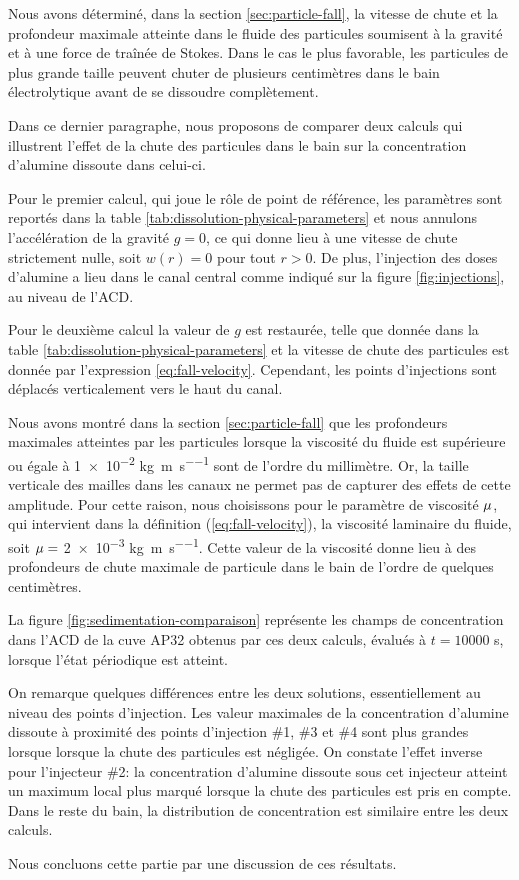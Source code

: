 Nous avons déterminé, dans la section \ref{sec:particle-fall}, la vitesse
de chute et la profondeur maximale atteinte dans le fluide des
particules soumisent à la gravité et à une force de traînée de
Stokes. Dans le cas le plus favorable, les particules de plus grande
taille peuvent chuter de plusieurs centimètres dans le bain
électrolytique avant de se dissoudre complètement.

Dans ce dernier paragraphe, nous proposons de comparer deux calculs
qui illustrent l'effet de la chute des particules dans le bain sur la
concentration d'alumine dissoute dans celui-ci.

Pour le premier calcul, qui joue le rôle de point de référence, les
paramètres sont reportés dans la table
\ref{tab:dissolution-physical-parameters} et nous annulons
l'accélération de la gravité $g = 0$, ce qui donne lieu à une vitesse
de chute strictement nulle, soit $w(r) = 0$ pour tout $r>0$. De plus,
l'injection des doses d'alumine a lieu dans le canal central comme
indiqué sur la figure \ref{fig:injections}, au niveau de l'ACD.

Pour le deuxième calcul la valeur de $g$ est restaurée, telle que
donnée dans la table \ref{tab:dissolution-physical-parameters} et la
vitesse de chute des particules est donnée par l'expression
\ref{eq:fall-velocity}. Cependant, les points d'injections sont
déplacés verticalement vers le haut du canal.

Nous avons montré dans la section \ref{sec:particle-fall} que les
profondeurs maximales atteintes par les particules lorsque la viscosité
du fluide est supérieure ou égale à \num{1e-2}
\si{\kilo\gram\per\meter\per\second} sont de l'ordre du
millimètre. Or, la taille verticale des mailles dans les canaux ne
permet pas de capturer des effets de cette amplitude. Pour cette
raison, nous choisissons pour le paramètre de viscosité
$\mu$, qui intervient dans la définition
(\ref{eq:fall-velocity}), la viscosité laminaire du fluide, soit
$\mu = $ \num{2e-3}
\si{\kilo\gram\per\meter\per\second}. Cette valeur de la viscosité
donne lieu à des profondeurs de chute maximale de particule dans le
bain de l'ordre de quelques centimètres.

La figure \ref{fig:sedimentation-comparaison} représente les champs de
concentration dans l'ACD de la cuve AP32 obtenus par ces deux calculs,
évalués à $t = \num{10000}$ \si{\second}, lorsque l'état périodique est
atteint.

On remarque quelques différences entre les deux solutions,
essentiellement au niveau des points d'injection. Les valeur maximales
de la concentration d'alumine dissoute à proximité des points
d'injection \#1, \#3 et \#4 sont plus grandes lorsque lorsque la chute
des particules est négligée. On constate l'effet inverse pour
l'injecteur \#2: la concentration d'alumine dissoute sous cet
injecteur atteint un maximum local plus marqué lorsque la chute des
particules est pris en compte. Dans le reste du bain, la distribution
de concentration est similaire entre les deux calculs.

Nous concluons cette partie par une discussion de ces résultats.
